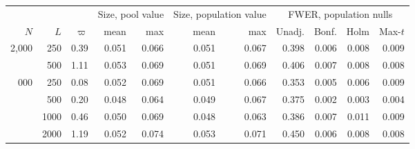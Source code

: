 \begin{tabular}{rr r rr rr rrrr}\toprule
 & & & \multicolumn{2}{c}{Size, pool value} & \multicolumn{2}{c}{Size, population value} & \multicolumn{4}{c}{FWER, population nulls} \\
$N$ & $L$ & $\varpi$ & mean & max & mean & max & Unadj. & Bonf. & Holm & Max-$t$ \\\midrule
2{,}000 & 250 & 0.39 & 0.051 & 0.066 & 0.051 & 0.067 & 0.398 & 0.006 & 0.008 & 0.009 \\
 & 500 & 1.11 & 0.053 & 0.069 & 0.051 & 0.069 & 0.406 & 0.007 & 0.008 & 0.008 \\
\addlinespace
8{,}000 & 250 & 0.08 & 0.052 & 0.069 & 0.051 & 0.066 & 0.353 & 0.005 & 0.006 & 0.009 \\
 & 500 & 0.20 & 0.048 & 0.064 & 0.049 & 0.067 & 0.375 & 0.002 & 0.003 & 0.004 \\
 & 1000 & 0.46 & 0.050 & 0.069 & 0.048 & 0.063 & 0.386 & 0.007 & 0.011 & 0.009 \\
 & 2000 & 1.19 & 0.052 & 0.074 & 0.053 & 0.071 & 0.450 & 0.006 & 0.008 & 0.008 \\
\bottomrule\end{tabular}
